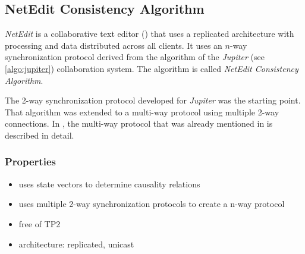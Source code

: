 \subsection{NetEdit Consistency Algorithm}
\label{algo:netedit}

\emph{NetEdit} is a collaborative text editor (\cite{netedit}) that uses a replicated architecture with processing and data distributed across all clients. It uses an $n$-way synchronization protocol derived from the algorithm of the \emph{Jupiter} (see \ref{algo:jupiter}) collaboration system. The algorithm is called \emph{NetEdit Consistency Algorithm}.

The 2-way synchronization protocol developed for \emph{Jupiter} was the starting point. That algorithm was extended to a multi-way protocol using multiple 2-way connections. In \cite{netedit:thesis}, the multi-way protocol that was already mentioned in \cite{jupiter95} is described in detail.

\subsubsection{Properties}
\begin{itemize}
 \item uses state vectors to determine causality relations
 \item uses multiple 2-way synchronization protocols to create a n-way protocol
 \item free of TP2
 \item architecture: replicated, unicast
\end{itemize}

